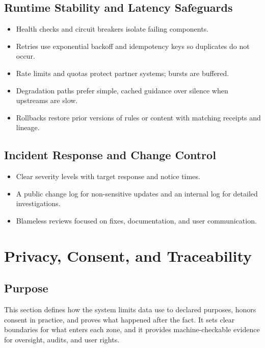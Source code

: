 \documentclass[12pt]{article}
\begin{document}
\subsection*{Runtime Stability and Latency Safeguards}
\begin{itemize}[leftmargin=*]
  \item Health checks and circuit breakers isolate failing components.
  \item Retries use exponential backoff and idempotency keys so duplicates do not occur.
  \item Rate limits and quotas protect partner systems; bursts are buffered.
  \item Degradation paths prefer simple, cached guidance over silence when upstreams are slow.
  \item Rollbacks restore prior versions of rules or content with matching receipts and lineage.
\end{itemize}

\subsection*{Incident Response and Change Control}
\begin{itemize}[leftmargin=*]
  \item Clear severity levels with target response and notice times.
  \item A public change log for non-sensitive updates and an internal log for detailed investigations.
  \item Blameless reviews focused on fixes, documentation, and user communication.
\end{itemize}


\section{Privacy, Consent, and Traceability}

\subsection*{Purpose}
This section defines how the system limits data use to declared purposes, honors consent in practice, and proves what happened after the fact. It sets clear boundaries for what enters each zone, and it provides machine-checkable evidence for oversight, audits, and user rights.
\end{document}
